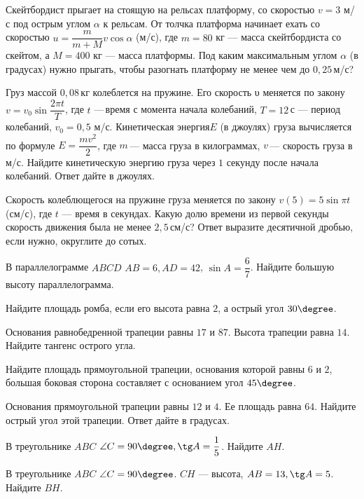 \begin{class}[number=4]
\begin{listofex}
		\item Скейтбордист прыгает на стоящую на рельсах платформу, со скоростью  \(v = 3\) м/с под острым углом \(\alpha\)  к рельсам. От толчка платформа начинает ехать со скоростью \(u = \dfrac{ m }{ m+M }v \cos \alpha\) (м/с), где \(m = 80\) кг --- масса скейтбордиста со скейтом, а \(M = 400\) кг --- масса платформы. Под каким максимальным углом \(\alpha\) (в градусах) нужно прыгать, чтобы разогнать платформу не менее чем до \(0,25\) м/с?
		\item Груз массой \(0,08\) кг колеблется на пружине. Его скорость υ меняется по закону \( v = v_0 \sin \dfrac{ 2\pi t }{ T } \), где \(t\) --- время с момента начала колебаний, \(T  =  12\) с --- период колебаний, \(v _0=0,5\) м/с. Кинетическая энергия\(E\) (в джоулях) груза вычисляется по формуле \( E = \dfrac{ m v^2 }{ 2 } \),  где \(m\) --- масса груза в килограммах, \(v\) --- скорость груза в м/с. Найдите кинетическую энергию груза через \(1\) секунду после начала колебаний. Ответ дайте в джоулях.
		\item Скорость колеблющегося на пружине груза меняется по закону \(v(5) = 5 \sin \pi t\) (см/с), где \(t\) --- время в секундах. Какую долю времени из первой секунды скорость движения была не менее \(2,5\) см/с? Ответ выразите десятичной дробью, если нужно, округлите до сотых.
		\item В параллелограмме \(ABCD\) \(AB  = 6, AD  =  42\), \(\sin A= \dfrac{ 6 }{ 7 } \).  Найдите большую высоту параллелограмма.
		\item Найдите площадь ромба, если его высота равна \(2\), а острый угол \(30 \degree \).
		\item Основания равнобедренной трапеции равны \(17\) и \(87\). Высота трапеции равна \(14\). Найдите тангенс острого угла.
		\item Найдите площадь прямоугольной трапеции, основания которой равны \(6\) и \(2\), большая боковая сторона составляет с основанием угол \(45\degree \).
		\item Основания прямоугольной трапеции равны \(12\) и \(4\). Ее площадь равна \(64\). Найдите острый угол этой трапеции. Ответ дайте в градусах.
		\item В треугольнике \(ABC\) \( \angle C = 90 \degree, \tg A = \dfrac{  1}{ 5 } \).  Найдите \(AH\).
		\item В треугольнике \(ABC\) \(\angle C = 90 \degree\). \(CH\) --- высота, \(AB=13, \tg A = 5\). Найдите \(BH\).
	\end{listofex}
\end{class}

